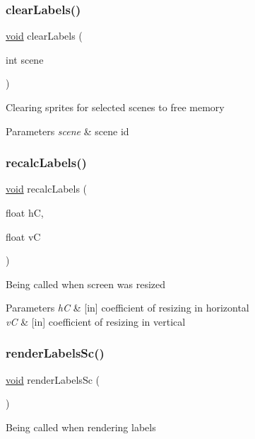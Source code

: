 \subsubsection{\texorpdfstring{clear\+Labels()}{clearLabels()}}
{\footnotesize\ttfamily \hyperlink{png_8h_ac9c84fa68bbad002983e35ce3663c686}{void} clear\+Labels (\begin{DoxyParamCaption}\item[{int}]{scene }\end{DoxyParamCaption})}

Clearing sprites for selected scenes to free memory 
\begin{DoxyParams}{Parameters}
{\em scene} & scene id \\
\hline
\end{DoxyParams}
\mbox{\label{group___label_ga44b3716da30f10b061357af0c53d19ac}} 
\subsubsection{\texorpdfstring{recalc\+Labels()}{recalcLabels()}}
{\footnotesize\ttfamily \hyperlink{png_8h_ac9c84fa68bbad002983e35ce3663c686}{void} recalc\+Labels (\begin{DoxyParamCaption}\item[{float}]{hC,  }\item[{float}]{vC }\end{DoxyParamCaption})}

Being called when screen was resized 
\begin{DoxyParams}{Parameters}
{\em hC} & \mbox{[}in\mbox{]} coefficient of resizing in horizontal \\
\hline
{\em vC} & \mbox{[}in\mbox{]} coefficient of resizing in vertical \\
\hline
\end{DoxyParams}
\mbox{\label{group___label_gac4652cfefc2d18651dd3ef401b6be15f}} 
\subsubsection{\texorpdfstring{render\+Labels\+Sc()}{renderLabelsSc()}}
{\footnotesize\ttfamily \hyperlink{png_8h_ac9c84fa68bbad002983e35ce3663c686}{void} render\+Labels\+Sc (\begin{DoxyParamCaption}{ }\end{DoxyParamCaption})}

Being called when rendering labels 